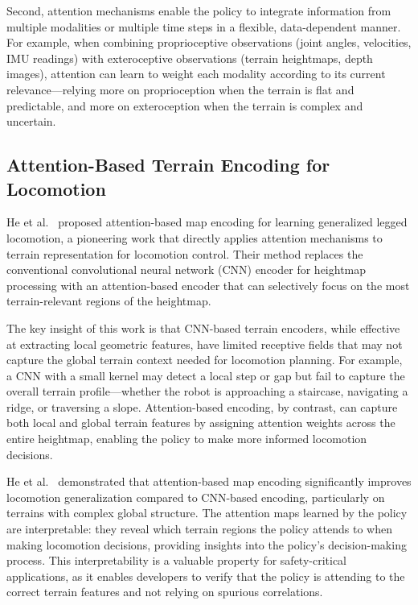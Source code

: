 Second, attention mechanisms enable the policy to integrate information from multiple modalities or multiple time steps in a flexible, data-dependent manner. For example, when combining proprioceptive observations (joint angles, velocities, IMU readings) with exteroceptive observations (terrain heightmaps, depth images), attention can learn to weight each modality according to its current relevance---relying more on proprioception when the terrain is flat and predictable, and more on exteroception when the terrain is complex and uncertain.

\subsection{Attention-Based Terrain Encoding for Locomotion}

He et al.~\cite{he2024attentionmap} proposed attention-based map encoding for learning generalized legged locomotion, a pioneering work that directly applies attention mechanisms to terrain representation for locomotion control. Their method replaces the conventional convolutional neural network (CNN) encoder for heightmap processing with an attention-based encoder that can selectively focus on the most terrain-relevant regions of the heightmap.

The key insight of this work is that CNN-based terrain encoders, while effective at extracting local geometric features, have limited receptive fields that may not capture the global terrain context needed for locomotion planning. For example, a CNN with a small kernel may detect a local step or gap but fail to capture the overall terrain profile---whether the robot is approaching a staircase, navigating a ridge, or traversing a slope. Attention-based encoding, by contrast, can capture both local and global terrain features by assigning attention weights across the entire heightmap, enabling the policy to make more informed locomotion decisions.

He et al.~\cite{he2024attentionmap} demonstrated that attention-based map encoding significantly improves locomotion generalization compared to CNN-based encoding, particularly on terrains with complex global structure. The attention maps learned by the policy are interpretable: they reveal which terrain regions the policy attends to when making locomotion decisions, providing insights into the policy's decision-making process. This interpretability is a valuable property for safety-critical applications, as it enables developers to verify that the policy is attending to the correct terrain features and not relying on spurious correlations.


